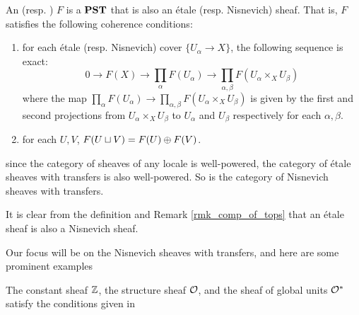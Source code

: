 \begin{defn}\label{def_etale_sheaf}\label{def_nis_sheaf}
An  (resp. ) $F$ is a $\mathbf{PST}$ that is also
an \'etale (resp. Nisnevich) sheaf. That is, $F$ satisfies the
following coherence conditions:
\begin{enumerate}
\item for each \'etale (resp. Nisnevich) cover $\{U_\alpha \to 
X\}$, the following sequence is exact:
\[
0 \to F(X) \to \prod_\alpha F(U_\alpha) \to \prod_{\alpha, \beta} 
   F(U_\alpha \times_X U_\beta)
\]
where the map $\prod_\alpha F(U_\alpha) \to \prod_{\alpha, \beta} 
F(U_\alpha \times_X U_\beta)$ is given by the first and second 
projections from $U_\alpha \times_X U_\beta$ to $U_\alpha$ and
$U_\beta$ respectively for each $\alpha, \beta$.

\item for each $U, V$, $F(U \sqcup V) = F(U) \oplus F(V)$.
\end{enumerate}
\end{defn}

since the category of sheaves of any locale is well-powered, the 
category of \'etale sheaves with transfers is also well-powered. 
So is the category of Nisnevich sheaves with transfers.



\begin{rmk}
It is clear from the definition and Remark \ref{rmk_comp_of_tops}
that an \'etale sheaf is also a Nisnevich sheaf.
\end{rmk}

Our focus will be on the Nisnevich sheaves with transfers, and 
here are some prominent examples 

\begin{ex}\label{ex_Z_O_Ostar}
The constant sheaf $\mathbb{Z}$, the structure sheaf $\mathcal{O}$, and the sheaf
of global units $\mathcal{O}^*$ satisfy the conditions given in 
\end{ex}

